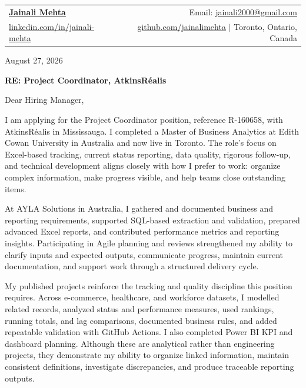 \documentclass[letterpaper,11pt]{article}
\begin{document}
\begin{tabular*}{\textwidth}{l@{\extracolsep{\fill}}r}
  \textbf{\href{https://www.linkedin.com/in/jainali-mehta}{\Large Jainali Mehta}} & Email: \href{mailto:jainali2000@gmail.com}{jainali2000@gmail.com}\\
  \href{https://www.linkedin.com/in/jainali-mehta}{linkedin.com/in/jainali-mehta} & \href{https://github.com/jainalimehta}{github.com/jainalimehta} $|$ Toronto, Ontario, Canada \\
\end{tabular*}

\hrulefill

\bigbreak
August 27, 2026

\bigbreak
\centerline{\large\textbf{RE: Project Coordinator, AtkinsRéalis}}

\bigbreak
Dear Hiring Manager,

\bigbreak
I am applying for the Project Coordinator position, reference R-160658, with AtkinsRéalis in Mississauga. I completed a Master of Business Analytics at Edith Cowan University in Australia and now live in Toronto. The role's focus on Excel-based tracking, current status reporting, data quality, rigorous follow-up, and technical development aligns closely with how I prefer to work: organize complex information, make progress visible, and help teams close outstanding items.

\bigbreak
At AYLA Solutions in Australia, I gathered and documented business and reporting requirements, supported SQL-based extraction and validation, prepared advanced Excel reports, and contributed performance metrics and reporting insights. Participating in Agile planning and reviews strengthened my ability to clarify inputs and expected outputs, communicate progress, maintain current documentation, and support work through a structured delivery cycle.

\bigbreak
My published projects reinforce the tracking and quality discipline this position requires. Across e-commerce, healthcare, and workforce datasets, I modelled related records, analyzed status and performance measures, used rankings, running totals, and lag comparisons, documented business rules, and added repeatable validation with GitHub Actions. I also completed Power BI KPI and dashboard planning. Although these are analytical rather than engineering projects, they demonstrate my ability to organize linked information, maintain consistent definitions, investigate discrepancies, and produce traceable reporting outputs.
\end{document}
